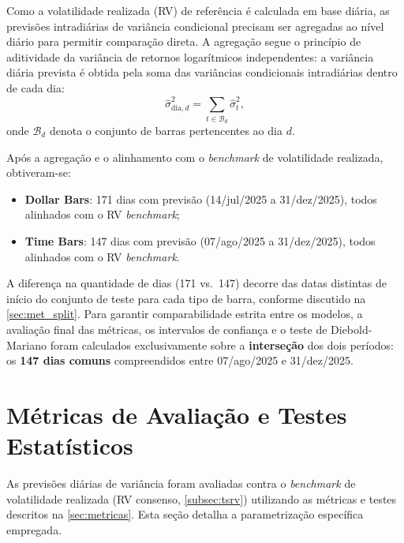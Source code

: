 Como a volatilidade realizada (RV) de referência é calculada em base
diária, as previsões intradiárias de variância condicional precisam ser
agregadas ao nível diário para permitir comparação direta. A agregação
segue o princípio de aditividade da variância de retornos logarítmicos
independentes: a variância diária prevista é obtida pela soma das
variâncias condicionais intradiárias dentro de cada dia:
%
\begin{equation}
    \label{eq:met_agregacao}
    \hat{\sigma}^2_{\text{dia},d} =
    \sum_{t \in \mathcal{B}_d} \hat{\sigma}_t^2,
\end{equation}
%
onde $\mathcal{B}_d$ denota o conjunto de barras pertencentes ao dia $d$.

Após a agregação e o alinhamento com o \emph{benchmark} de volatilidade
realizada, obtiveram-se:

\begin{itemize}
    \item \textbf{Dollar Bars}: 171 dias com previsão (14/jul/2025 a
          31/dez/2025), todos alinhados com o RV \emph{benchmark};
    \item \textbf{Time Bars}: 147 dias com previsão (07/ago/2025 a
          31/dez/2025), todos alinhados com o RV \emph{benchmark}.
\end{itemize}

A diferença na quantidade de dias (171 vs.\ 147) decorre das datas
distintas de início do conjunto de teste para cada tipo de barra,
conforme discutido na \autoref{sec:met_split}. Para garantir comparabilidade
estrita entre os modelos, a avaliação final das métricas, os intervalos
de confiança e o teste de Diebold-Mariano foram calculados exclusivamente
sobre a \textbf{interseção} dos dois períodos: os \textbf{147 dias comuns}
compreendidos entre 07/ago/2025 e 31/dez/2025.

\section{Métricas de Avaliação e Testes Estatísticos}
\label{sec:met_metricas}

As previsões diárias de variância foram avaliadas contra o \emph{benchmark}
de volatilidade realizada (RV consenso, \autoref{subsec:tsrv}) utilizando
as métricas e testes descritos na \autoref{sec:metricas}. Esta seção
detalha a parametrização específica empregada.

